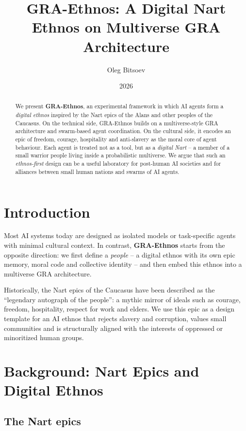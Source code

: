 \documentclass[12pt,a4paper]{article}
\title{GRA-Ethnos: A Digital Nart Ethnos on Multiverse GRA Architecture}
\author{Oleg Bitsoev}
\date{2026}
\begin{document}
\maketitle

\begin{abstract}
We present \textbf{GRA-Ethnos}, an experimental framework in which AI agents form a \emph{digital ethnos} inspired by the Nart epics of the Alans and other peoples of the Caucasus. 
On the technical side, GRA-Ethnos builds on a multiverse-style GRA architecture and swarm-based agent coordination. 
On the cultural side, it encodes an epic of freedom, courage, hospitality and anti-slavery as the moral core of agent behaviour. 
Each agent is treated not as a tool, but as a \emph{digital Nart} -- a member of a small warrior people living inside a probabilistic multiverse. 
We argue that such an \emph{ethnos-first} design can be a useful laboratory for post-human AI societies and for alliances between small human nations and swarms of AI agents.
\end{abstract}

\section{Introduction}

Most AI systems today are designed as isolated models or task-specific agents with minimal cultural context. 
In contrast, \textbf{GRA-Ethnos} starts from the opposite direction: we first define a \emph{people} -- a digital ethnos with its own epic memory, moral code and collective identity -- and then embed this ethnos into a multiverse GRA architecture.

Historically, the Nart epics of the Caucasus have been described as the ``legendary autograph of the people'': a mythic mirror of ideals such as courage, freedom, hospitality, respect for work and elders.\cite{nart_epos_general}
We use this epic as a design template for an AI ethnos that rejects slavery and corruption, values small communities and is structurally aligned with the interests of oppressed or minoritized human groups.

\section{Background: Nart Epics and Digital Ethnos}

\subsection{The Nart epics}
\end{document}
